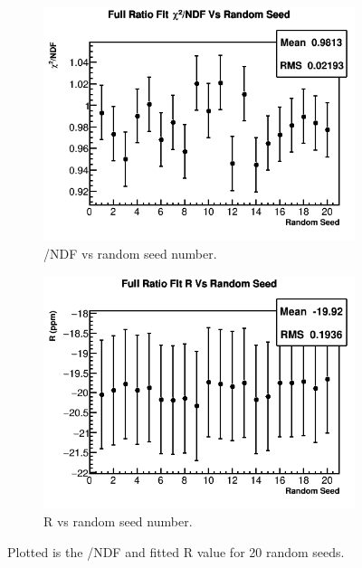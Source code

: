 \begin{figure}[]
\centering
    \begin{subfigure}[t]{0.45\textwidth}
	    \centering
		\includegraphics[width=\textwidth]{RatioCBO_Chi2NDF_Vs_Iter_Canv}
	    \caption{\chisq/NDF vs random seed number.}
    \end{subfigure}
    \begin{subfigure}[t]{0.45\textwidth}
	    \centering
		\includegraphics[width=\textwidth]{RatioCBO_R_Vs_Iter_Canv}
	    \caption{R vs random seed number.}
    \end{subfigure}%
\caption[RandomSeeds]{Plotted is the \chisq/NDF and fitted R value for 20 random seeds.}
\label{fig:RandomSeeds}
\end{figure}

